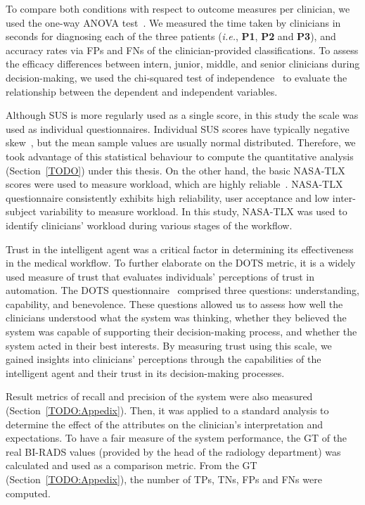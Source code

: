 \vspace{1.5mm}

To compare both conditions with respect to outcome measures per clinician, we used the one-way \ac{ANOVA} test~\cite{SADEGHI2022105554, 10.1145/3491102.3517791}.
We measured the time taken by clinicians in seconds for diagnosing each of the three patients ({\it i.e.}, {\bf P1}, {\bf P2} and {\bf P3}), and accuracy rates via \acp{FP} and \acp{FN} of the clinician-provided classifications.
To assess the efficacy differences between intern, junior, middle, and senior clinicians during decision-making, we used the chi-squared test of independence~\cite{10.1145/3411764.3445464} to evaluate the relationship between the dependent and independent variables.

Although \ac{SUS} is more regularly used as a single score, in this study the scale was used as individual questionnaires.
Individual \ac{SUS} scores have typically negative skew~\cite{lewis2018system}, but the mean sample values are usually normal distributed.
Therefore, we took advantage of this statistical behaviour to compute the quantitative analysis (Section~\ref{TODO}) under this thesis.
On the other hand, the basic \ac{NASA-TLX} scores were used to measure workload, which are highly reliable~\cite{ramkumar2017using}.
\ac{NASA-TLX} questionnaire consistently exhibits high reliability, user acceptance and low inter-subject variability to measure workload.
In this study, \ac{NASA-TLX} was used to identify clinicians' workload during various stages of the workflow.

Trust in the intelligent agent was a critical factor in determining its effectiveness in the medical workflow.
To further elaborate on the \ac{DOTS} metric, it is a widely used measure of trust that evaluates individuals' perceptions of trust in automation.
The \ac{DOTS} questionnaire~\cite{https://doi.org/10.13140/RG.2.2.23078.37448/1} comprised three questions: understanding, capability, and benevolence.
These questions allowed us to assess how well the clinicians understood what the system was thinking, whether they believed the system was capable of supporting their decision-making process, and whether the system acted in their best interests.
By measuring trust using this scale, we gained insights into clinicians' perceptions through the capabilities of the intelligent agent and their trust in its decision-making processes.

Result metrics of recall and precision of the system were also measured (Section~\ref{TODO:Appedix}).
Then, it was applied to a standard analysis to determine the effect of the attributes on the clinician's interpretation and expectations.
To have a fair measure of the system performance, the \ac{GT} of the real \ac{BI-RADS} values (provided by the head of the radiology department) was calculated and used as a comparison metric.
From the \ac{GT} (Section~\ref{TODO:Appedix}), the number of \acfp{TP}, \acfp{TN}, \acfp{FP} and \acfp{FN} were computed.

